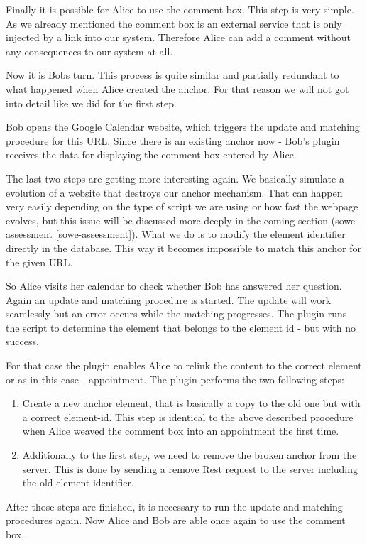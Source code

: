 Finally it is possible for Alice to use the comment box. This step is very simple. As we already mentioned the comment box is an external service that is only injected by a link into our system. Therefore Alice can add a comment without any consequences to our system at all.

Now it is Bobs turn. This process is quite similar and partially redundant to what happened when Alice created the anchor. For that reason we will not got into detail like we did for the first step.

Bob opens the Google Calendar website, which triggers the update and matching procedure for this URL. Since there is an existing anchor now - Bob's plugin receives the data for displaying the comment box entered by Alice. 

The last two steps are getting more interesting again. We basically simulate a evolution of a website that destroys our anchor mechanism. That can happen very easily depending on the type of script we are using or how fast the webpage evolves, but this issue will be discussed more deeply in the coming section (\refname{sowe-assessment} \ref{sowe-assessment}). What we do is to modify the element identifier directly in the database. This way it becomes impossible to match this anchor for the given URL. 

So Alice visits her calendar to check whether Bob has answered her question. Again an update and matching procedure is started. The update will work seamlessly but an error occurs while the matching progresses. The plugin runs the script to determine the element that belongs to the element id - but with no success. 

For that case the plugin enables Alice to relink the content to the correct element or as in this case - appointment. The plugin performs the two following steps:
\begin{enumerate}
	\item Create a new anchor element, that is basically a copy to the old one but with a correct element-id. This step is identical to the above described procedure when Alice weaved the comment box into an appointment the first time. 
	\item  Additionally to the first step, we need to remove the broken anchor from the server. This is done by sending a remove Rest request to the server including the old element identifier. 
\end{enumerate} 
After those steps are finished, it is necessary to run the update and matching procedures again. Now Alice and Bob are able once again to use the comment box. 

